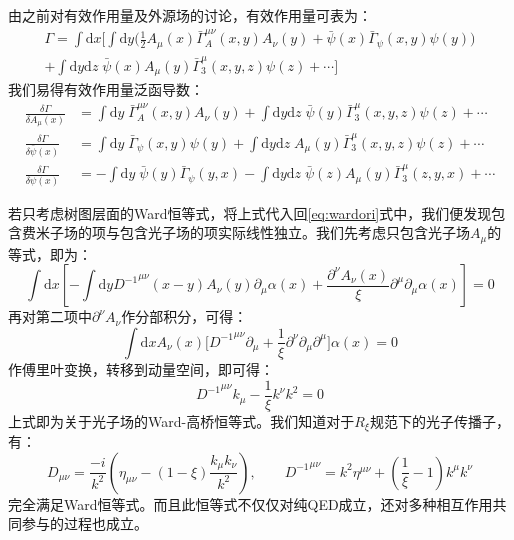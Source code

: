 由之前对有效作用量及外源场的讨论，有效作用量可表为：
\begin{multline}
	\Gamma=\int\mathrm{d}x\Big[\int\mathrm{d}y\Big(	\frac{1}{2}A_\mu(x)\bar{\Gamma}^{\mu\nu}_{A}(x,y)A_\nu(y)+\bar{\psi}(x)\bar{\Gamma}_{\psi}(x,y)\psi(y)\Big)	\\	+\int\mathrm{d}y\mathrm{d}z\;\bar{\psi}(x)A_\mu(y)\bar{\Gamma}^\mu_3(x,y,z)\psi(z)+\cdots\Big]
\end{multline}
我们易得有效作用量泛函导数：
\begin{align}
	\frac{\delta \Gamma}{\delta A_\mu(x)}&=\int\mathrm{d}y\; \bar{\Gamma}^{\mu\nu}_A(x,y)A_\nu(y)+\int\mathrm{d}y\mathrm{d}z\;\bar{\psi}(y)\bar{\Gamma}^\mu_3(x,y,z)\psi(z)+\cdots\\
	\frac{\delta \Gamma}{\delta \bar{\psi}(x)}&=\int\mathrm{d}y\;\bar{\Gamma}_\psi(x,y)\psi(y)+\int\mathrm{d}y\mathrm{d}z\;A_\mu(y)\bar{\Gamma}^\mu_3(x,y,z)\psi(z)+\cdots\\
	\frac{\delta \Gamma}{\delta {\psi}(x)}&=-\int\mathrm{d}y\;\bar{\psi}(y)\bar{\Gamma}_{\psi}(y,x)-\int\mathrm{d}y\mathrm{d}z\;\bar{\psi}(z)A_\mu(y)\bar{\Gamma}^\mu_3(z,y,x)+\cdots
\end{align}

若只考虑树图层面的Ward恒等式，将上式代入回\eqref{eq:wardori}式中，我们便发现包含费米子场的项与包含光子场的项实际线性独立。我们先考虑只包含光子场$A_\mu$的等式，即为：
\begin{equation}
	\int\mathrm{d}x\left[-\int\mathrm{d}y{D^{-1}}^{\mu\nu}(x-y)A_\nu(y) \partial_\mu\alpha(x)+\frac{\partial^\nu A_\nu(x)}{\xi}\partial^\mu\partial_\mu\alpha(x)\right]=0
\end{equation}
再对第二项中$\partial^\nu A_\nu$作分部积分，可得：
\begin{equation}
	\int\mathrm{d}x A_\nu(x)\Big[{D^{-1}}^{\mu\nu}\partial_\mu+\frac{1 }{\xi}\partial^\nu\partial_\mu\partial^\mu\Big]\alpha(x)=0
\end{equation}
作傅里叶变换，转移到动量空间，即可得：
\begin{equation}
	{D^{-1}}^{\mu\nu}k_\mu-\frac{1}{\xi}k^\nu k^2=0
\end{equation}
上式即为关于光子场的Ward-高桥恒等式。我们知道对于$R_\xi$规范下的光子传播子，有：
\begin{equation}
	D_{\mu\nu}=\frac{-i}{k^2}\left(\eta_{\mu\nu}-(1-\xi)\frac{k_\mu k_\nu}{k^2}\right),\qquad{D^{-1}}^{\mu\nu}=k^2\eta^{\mu\nu}+(\frac{1}{\xi}-1)k^\mu k^\nu
\end{equation}
完全满足Ward恒等式。而且此恒等式不仅仅对纯QED成立，还对多种相互作用共同参与的过程也成立。

